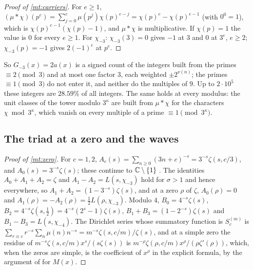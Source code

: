 \documentclass[11pt]{article}
\theoremstyle{definition}\newtheorem{definition}[theorem]{Definition}
\theoremstyle{remark}\newtheorem{remark}[theorem]{Remark}
\theoremstyle{definition}\newtheorem{axiom}{Axiom}
\begin{document}
\begin{proof}[Proof of \cref{mt:carriers}]
For $e\ge1$, $(\mu*\chi)(p^e)=\sum_{j=0}^e\mu(p^j)\chi(p)^{e-j}=\chi(p)^e-\chi(p)^{e-1}$ (with $0^0=1$), which is $\chi(p)^{e-1}(\chi(p)-1)$, and $\mu*\chi$ is multiplicative. If $\chi(p)=1$ the value is $0$ for every $e\ge1$. For $\chi_{-3}$: $\chi_{-3}(3)=0$ gives $-1$ at $3$ and $0$ at $3^e$, $e\ge2$; $\chi_{-3}(p)=-1$ gives $2(-1)^e$ at $p^e$.
\end{proof}

So $G_{-3}(x)=2a(x)$ is a signed count of the integers built from the primes $\equiv2\pmod3$ and at most one factor $3$, each weighted $\pm2^{\nu(n)}$; the primes $\equiv1\pmod3$ do not enter it, and neither do the multiples of $9$. Up to $2\cdot10^5$ these integers are $28.59\%$ of all integers. The same holds at every modulus: the unit classes of the tower modulo $3^\kappa$ are built from $\mu*\chi$ for the characters $\chi\bmod3^\kappa$, which vanish on every multiple of a prime $\equiv1\pmod{3^\kappa}$.

\subsection{The triad at a zero and the waves}

\begin{proof}[Proof of \cref{mt:zero}]
For $c=1,2$, $A_c(s)=\sum_{n\ge0}(3n+c)^{-s}=3^{-s}\zeta(s,c/3)$, and $A_0(s)=3^{-s}\zeta(s)$; these continue to $\mathbb C\setminus\{1\}$ \cite[Ch.~12]{Apostol}. The identities $A_0+A_1+A_2=\zeta$ and $A_1-A_2=L(s,\chi_{-3})$ hold for $\sigma>1$ and hence everywhere, so $A_1+A_2=(1-3^{-s})\zeta(s)$, and at a zero $\rho$ of $\zeta$, $A_0(\rho)=0$ and $A_1(\rho)=-A_2(\rho)=\frac12L(\rho,\chi_{-3})$. Modulo $4$, $B_0=4^{-s}\zeta(s)$, $B_2=4^{-s}\zeta(s,\frac12)=4^{-s}(2^s-1)\zeta(s)$, $B_1+B_3=(1-2^{-s})\zeta(s)$ and $B_1-B_3=L(s,\chi_{-4})$. The Dirichlet series whose summatory function is $S^{(m)}_c$ is $\sum_{r\equiv c}r^{-s}\sum_n\mu(n)n^{-s}=m^{-s}\zeta(s,c/m)/\zeta(s)$, and at a simple zero the residue of $m^{-s}\zeta(s,c/m)x^s/(s\zeta(s))$ is $m^{-\rho}\zeta(\rho,c/m)x^\rho/(\rho\zeta'(\rho))$, which, when the zeros are simple, is the coefficient of $x^\rho$ in the explicit formula, by the argument of \cite[Theorem 14.27]{Titchmarsh} for $M(x)$.
\end{proof}
\end{document}
